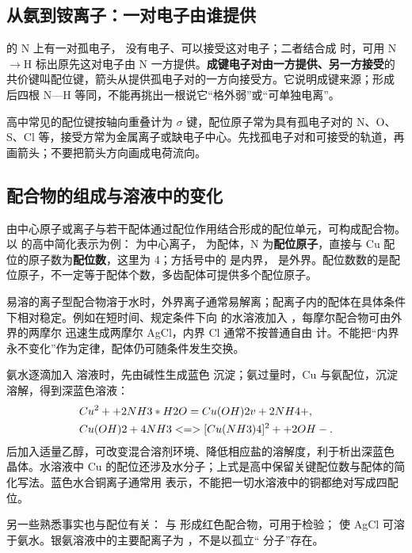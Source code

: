 \subsection{从氨到铵离子：一对电子由谁提供}
 的 N 上有一对孤电子， 没有电子、可以接受这对电子；二者结合成  时，可用 N$\to$H 标出原先这对电子由 N 一方提供。\textbf{成键电子对由一方提供、另一方接受}的共价键叫配位键，箭头从提供孤电子对的一方向接受方。它说明成键来源；形成  后四根 N—H 等同，不能再挑出一根说它“格外弱”或“可单独电离”。

高中常见的配位键按轴向重叠计为 $\sigma$ 键，配位原子常为具有孤电子对的 N、O、S、Cl 等，接受方常为金属离子或缺电子中心。先找孤电子对和可接受的轨道，再画箭头；不要把箭头方向画成电荷流向。

\subsection{配合物的组成与溶液中的变化}
由中心原子或离子与若干配体通过配位作用结合形成的配位单元，可构成配合物。以  的高中简化表示为例： 为中心离子， 为配体，N 为\textbf{配位原子}，直接与 Cu 配位的原子数为\textbf{配位数}，这里为 4；方括号中的  是内界， 是外界。配位数数的是配位原子，不一定等于配体个数，多齿配体可提供多个配位原子。

易溶的离子型配合物溶于水时，外界离子通常易解离；配离子内的配体在具体条件下相对稳定。例如在短时间、规定条件下向  的水溶液加入 ，每摩尔配合物可由外界的两摩尔  迅速生成两摩尔 AgCl，内界 Cl 通常不按普通自由  计。不能把“内界永不变化”作为定律，配体仍可随条件发生交换。

氨水逐滴加入  溶液时，先由碱性生成蓝色  沉淀；氨过量时，Cu 与氨配位，沉淀溶解，得到深蓝色溶液：
\begin{align*}
&Cu^2+ + 2NH3*H2O = Cu(OH)2 v + 2NH4+,\\
&Cu(OH)2 + 4NH3 <=> [Cu(NH3)4]^2+ + 2OH-.
\end{align*}
后加入适量乙醇，可改变混合溶剂环境、降低相应盐的溶解度，利于析出深蓝色  晶体。水溶液中 Cu 的配位还涉及水分子；上式是高中保留关键配位数与配体的简化写法。蓝色水合铜离子通常用  表示，不能把一切水溶液中的铜都绝对写成四配位。

另一些熟悉事实也与配位有关： 与  形成红色配合物，可用于检验； 使 AgCl 可溶于氨水。银氨溶液中的主要配离子为 \ce{[Ag(NH3)2]+}，不是以孤立“ 分子”存在。

